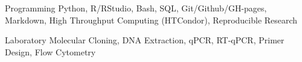 

\begin{cvskills}

  \cvskill
    {Programming} %
    {Python, R/RStudio, Bash, SQL, Git/Github/GH-pages, Markdown, High Throughput Computing (HTCondor), Reproducible Research} %

  \cvskill
    {Laboratory} %
    {Molecular Cloning, DNA Extraction, qPCR, RT-qPCR, Primer Design, Flow Cytometry} %

\end{cvskills}
